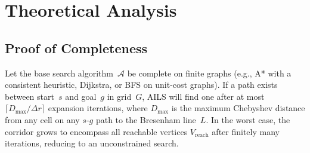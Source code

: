 \documentclass[11pt]{article}
\begin{document}
\section{Theoretical Analysis}

\subsection{Proof of Completeness}

\begin{theorem}
Let the base search algorithm~$\mathcal{A}$ be complete on finite graphs (e.g., A* with a consistent heuristic, Dijkstra, or BFS on unit-cost graphs).
If a path exists between start~$s$ and goal~$g$ in grid~$G$, AILS will find one after at most $\lceil D_{\max}/\Delta r \rceil$ expansion iterations, where $D_{\max}$ is the maximum Chebyshev distance from any cell on any $s$-$g$ path to the Bresenham line~$L$.
In the worst case, the corridor grows to encompass all reachable vertices $V_{\mathrm{reach}}$ after finitely many iterations, reducing to an unconstrained search.
\end{theorem}
\end{document}
